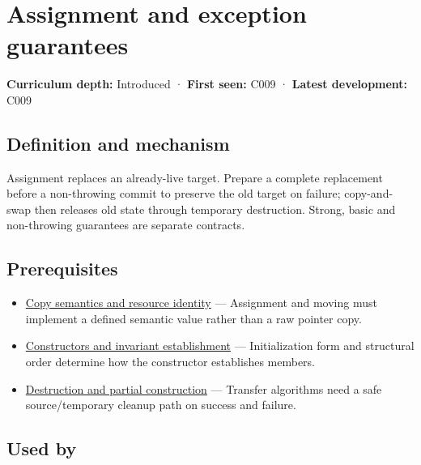 \hypertarget{appendix-bea6beb5350f}{}\label{referencestart:appendix-bea6beb5350f}
\section{Assignment and exception guarantees}\label{appendix-bea6beb5350f-assignment-and-exception-guarantees}

\textbf{Curriculum depth:} Introduced · \textbf{First seen:} C009 · \textbf{Latest development:} C009

\begin{allmightroledefinition}

\subsection{Definition and mechanism}\label{appendix-bea6beb5350f-definition-and-mechanism}

Assignment replaces an already-live target. Prepare a complete replacement before a non-throwing commit to preserve the old target on failure; copy-and-swap then releases old state through temporary destruction. Strong, basic and non-throwing guarantees are separate contracts.

\end{allmightroledefinition}

\subsection{Prerequisites}\label{appendix-bea6beb5350f-prerequisites}

\begin{itemize}
\tightlist
\item
  \hyperref[appendix-1340cd1ce582]{Copy semantics and resource identity} --- Assignment and moving must implement a defined semantic value rather than a raw pointer copy.
\item
  \hyperref[appendix-7f8ec83d0886]{Constructors and invariant establishment} --- Initialization form and structural order determine how the constructor establishes members.
\item
  \hyperref[appendix-9bfe377cef7a]{Destruction and partial construction} --- Transfer algorithms need a safe source/temporary cleanup path on success and failure.
\end{itemize}

\subsection{Used by}\label{appendix-bea6beb5350f-used-by}

